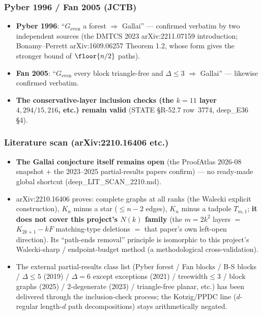 \subsubsection{Pyber 1996 / Fan 2005 (JCTB)}\label{subsec:add-litpf}

\begin{itemize}
\item \textbf{Pyber 1996}: ``$G_\mathrm{even}$ a forest $\Rightarrow$
Gallai'' --- confirmed verbatim by two independent sources (the DMTCS 2023
arXiv:2211.07159 introduction; Bonamy--Perrett arXiv:1609.06257 Theorem 1.2,
whose form gives the stronger bound of $\floor{n/2}$ paths).
\item \textbf{Fan 2005}: ``$G_\mathrm{even}$ every block triangle-free and
$\Delta\le3$ $\Rightarrow$ Gallai'' --- likewise confirmed verbatim.
\item \textbf{The conservative-layer inclusion checks (the $k=11$ layer
$4{,}294/15{,}216$, etc.) remain valid} (STATE \S R-52.7 row~3774,
deep\_E36 \S4).
\end{itemize}

\subsubsection{Literature scan (arXiv:2210.16406 etc.)}\label{subsec:add-litscan}

\begin{itemize}
\item \textbf{The Gallai conjecture itself remains open} (the ProofAtlas
2026-08 snapshot $+$ the 2023--2025 partial-results papers confirm) --- no
ready-made global shortcut (deep\_LIT\_SCAN\_2210.md).
\item arXiv:2210.16406 proves: complete graphs at all ranks (the Walecki
explicit construction), $K_n$ minus a star ($\le n-2$ edges), $K_n$ minus a
tadpole $T_{m,1}$; \textbf{it does not cover this project's $N(k)$ family}
(the $m=2k^2$ layers $=$ $K_{2k+1}-kF$ matching-type deletions $=$ that
paper's own left-open direction). Its ``path-ends removal'' principle is
isomorphic to this project's Walecki-sharp / endpoint-budget method (a
methodological cross-validation).
\item The external partial-results class list (Pyber forest / Fan blocks /
B-S blocks / $\Delta\le5$ (2019) / $\Delta=6$ except exceptions (2021) /
treewidth$\le3$ / block graphs (2025) / 2-degenerate (2023) /
triangle-free planar, etc.) has been delivered through the inclusion-check
process; the Kotzig/PPDC line ($d$-regular length-$d$ path decompositions)
stays arithmetically negated.
\end{itemize}

